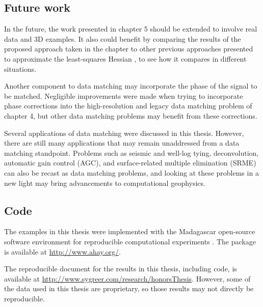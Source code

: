 \subsection{Future work}
In the future, the work presented in chapter 5 should be extended to involve real data and 3D examples. 
It also could benefit by comparing the results of the proposed approach taken in the chapter to other previous approaches presented to approximate the least-squares Hessian \cite[]{migdec,lsamp,siklsm,pwlsrtm,diagamp,debflt,prestack,poststack}, to see how it compares in different situations.

Another component to data matching may incorporate the phase of the signal to be matched. 
Negligible improvements were made when trying to incorporate phase corrections into the high-resolution and legacy data matching problem of chapter 4, but other data matching problems may benefit from these corrections.

Several applications of data matching were discussed in this thesis. 
However, there are still many applications that may remain unaddressed from a data matching standpoint. 
Problems such as seismic and well-log tying, deconvolution, automatic gain control (AGC), and surface-related multiple elimination (SRME) can also be recast as data matching problems, and looking at these problems in a new light may bring advancements to computational geophysics.

\subsection{Code}
The examples in this thesis were implemented with the Madagascar open-source software environment for reproducible computational experiments \cite[]{madagacsar}.
The package is available at \url{http://www.ahay.org/}.

The reproducible document for the results in this thesis, including code, is available at \url{http://www.sygreer.com/research/honorsThesis}.
However, some of the data used in this thesis are proprietary, so those results may not directly be reproducible.
